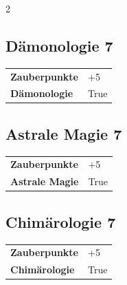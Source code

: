 \begin{multicols}{2}
\begin{tcolorbox}
    \subsection*{Dämonologie \hfill \small{7 }}
    \tcblower




\begin{tabular}{@{}ll@{}}
    \textbf{Zauberpunkte} & +5\\
    \textbf{Dämonologie} & True\\
\end{tabular}


\end{tcolorbox}

\begin{tcolorbox}
    \subsection*{Astrale Magie \hfill \small{7 }}
    \tcblower




\begin{tabular}{@{}ll@{}}
    \textbf{Zauberpunkte} & +5\\
    \textbf{Astrale Magie} & True\\
\end{tabular}


\end{tcolorbox}

\begin{tcolorbox}
    \subsection*{Chimärologie \hfill \small{7 }}
    \tcblower




\begin{tabular}{@{}ll@{}}
    \textbf{Zauberpunkte} & +5\\
    \textbf{Chimärologie} & True\\
\end{tabular}


\end{tcolorbox}
\end{multicols}

